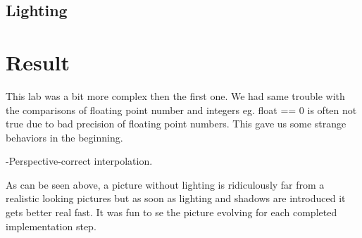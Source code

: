 \documentclass[a4paper,11pt]{article}
\begin{document}
\subsection{Lighting}


\section{Result}
This lab was a bit more complex then the first one. We had same trouble with the comparisons of floating point number and integers eg. float == 0 is often not true due to bad precision of floating point numbers. This gave us some strange behaviors in the beginning.



-Perspective-correct interpolation. 


As can be seen above, a picture without lighting is ridiculously far from a realistic looking pictures but as soon as lighting and shadows are introduced it gets better real fast. It was fun to se the picture evolving for each completed implementation step. 
\end{document}
